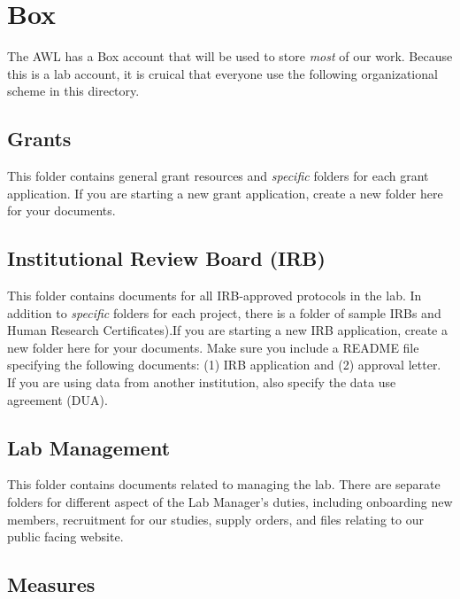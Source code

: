 \documentclass[]{book}
\begin{document}
\hypertarget{box}{%
\section{Box}\label{box}}

The AWL has a Box account that will be used to store \emph{most} of our work. Because this is a lab account, it is cruical that everyone use the following organizational scheme in this directory.

\hypertarget{grants}{%
\subsection{Grants}\label{grants}}

This folder contains general grant resources and \emph{specific} folders for each grant application. If you are starting a new grant application, create a new folder here for your documents.

\hypertarget{institutional-review-board-irb}{%
\subsection{Institutional Review Board (IRB)}\label{institutional-review-board-irb}}

This folder contains documents for all IRB-approved protocols in the lab. In addition to \emph{specific} folders for each project, there is a folder of sample IRBs and Human Research Certificates).If you are starting a new IRB application, create a new folder here for your documents. Make sure you include a README file specifying the following documents: (1) IRB application and (2) approval letter. If you are using data from another institution, also specify the data use agreement (DUA).

\hypertarget{lab-management}{%
\subsection{Lab Management}\label{lab-management}}

This folder contains documents related to managing the lab. There are separate folders for different aspect of the Lab Manager's duties, including onboarding new members, recruitment for our studies, supply orders, and files relating to our public facing website.

\hypertarget{measures}{%
\subsection{Measures}\label{measures}}
\end{document}
